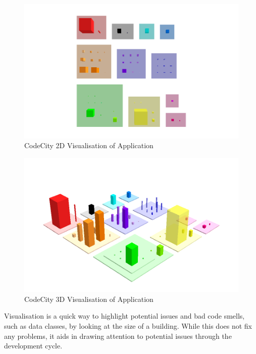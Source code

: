 \begin{figure}[H]
\begin{center}
\includegraphics[scale=0.5]{codecity2d.png}
\caption{CodeCity 2D Visualisation of Application}
\label{fig:2dcc}
\end{center}
\end{figure}

\begin{figure}[H]
\begin{center}
\includegraphics[scale=0.5]{codecity3d.png}
\caption{CodeCity 3D Visualisation of Application}
\label{fig:3dcc}
\end{center}
\end{figure}

Visualisation is a quick way to highlight potential issues and bad code smells, such as data classes, by looking at the size of a building. While this does not fix any problems, it aids in drawing attention to potential issues through the development cycle. 